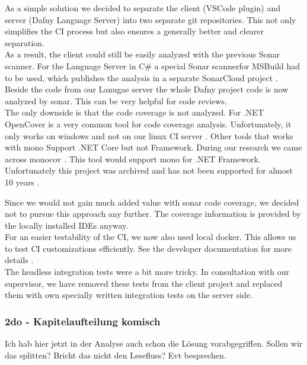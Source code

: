 As a simple solution we decided to separate the client (VSCode plugin) and server (Dafny Language Server) into two separate git repositories.
This not only simplifies the CI process but also ensures a generally better and clearer separation. \\

As a result, the client could still be easily analyzed with the previous Sonar scanner.
For the Language Server in C\# a special Sonar scannerfor MSBuild had to be used, which publishes the analysis in a separate SonarCloud project \cite{dev}.
Beside the code from our Lanugae server the whole Dafny project code is now analyzed by sonar.
This can be very helpful for code reviews. \\

The only downside is that the code coverage is not analyzed.
For .NET OpenCover is a very common tool for code coverage analysis.
Unfortunately, it only works on windows and not on our linux CI server \cite{opencover}.
Other tools that works with mono Support .NET Core but not Framework.
During our research we came across monocov \cite{monocov}. This tool would support mono for .NET Framework. Unfortunately this project was archived and has not been supported for almost 10 years \cite{monocov}.

Since we would not gain much added value with sonar code coverage, we decided not to pursue this approach any further. The coverage information is provided by the locally installed IDEs anyway. 
\\

For an easier testability of the CI, we now also used local docker. This allows us to test CI customizations efficiently. See the developer documentation for more details \cite{dev}. \\

The headless integration tests were a bit more tricky.
In consultation with our supervisor, we have removed these tests from the client project and replaced them with own specially written integration tests on the server side.

\subsubsection{2do - Kapitelaufteilung komisch}
Ich hab hier jetzt in der Analyse auch schon die Lösung vorabgegriffen. Sollen wir das splitten? Bricht das nicht den Lesefluss? Evt besprechen.
